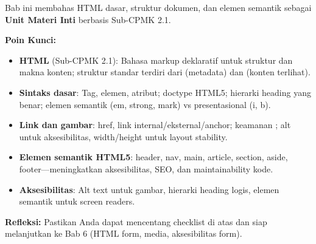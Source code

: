 \documentclass[../main.tex]{subfiles}
\begin{document}
\begin{rangkuman}
Bab ini membahas HTML dasar, struktur dokumen, dan elemen semantik sebagai \textbf{Unit Materi Inti} berbasis Sub-CPMK 2.1.

\textbf{Poin Kunci:}
\begin{itemize}
  \item \textbf{HTML} (Sub-CPMK 2.1): Bahasa markup deklaratif untuk struktur dan makna konten; struktur standar terdiri dari  (metadata) dan  (konten terlihat).
  \item \textbf{Sintaks dasar}: Tag, elemen, atribut; doctype HTML5; hierarki heading yang benar; elemen semantik (em, strong, mark) vs presentasional (i, b).
  \item \textbf{Link dan gambar}: href, link internal/eksternal/anchor; keamanan ; alt untuk aksesibilitas, width/height untuk layout stability.
  \item \textbf{Elemen semantik HTML5}: header, nav, main, article, section, aside, footer---meningkatkan aksesibilitas, SEO, dan maintainability kode.
  \item \textbf{Aksesibilitas}: Alt text untuk gambar, hierarki heading logis, elemen semantik untuk screen readers.
\end{itemize}

\textbf{Refleksi:} Pastikan Anda dapat mencentang checklist di atas dan siap melanjutkan ke Bab 6 (HTML form, media, aksesibilitas form).
\end{rangkuman}

\ifSubfilesClassLoaded{
  \renewcommand{\bibname}{Daftar Pustaka}
  
  
}{}
\end{document}
